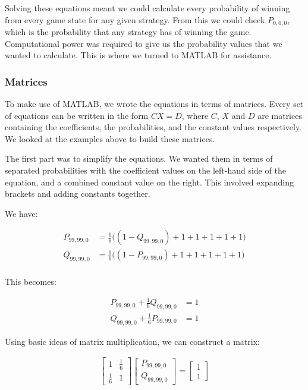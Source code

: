 \documentclass[a4paper,titlepage]{article}
\begin{document}
Solving these equations meant we could calculate every probability of winning from every game state for any given strategy. From this we could check $P_{0,0,0}$, which is the probability that any strategy has of winning the game. Computational power was required to give us the probability values that we wanted to calculate. This is where we turned to MATLAB for assistance.

\subsubsection{Matrices}
To make use of MATLAB, we wrote the equations in terms of matrices. Every set of equations can be written in the form $CX=D$, where $C$, $X$ and $D$ are matrices containing the coefficients, the probabilities, and the constant values respectively. We looked at the examples above to build these matrices.

The first part was to simplify the equations. We wanted them in terms of separated probabilities with the coefficient values on the left-hand side of the equation, and a combined constant value on the right. This involved expanding brackets and adding constants together.

 We have:

\begin{align*}
	P_{99,99,0} &= \frac{1}{6}\bigg((1 - Q_{99,99,0}) + 1 + 1 + 1 + 1 + 1\bigg)\\
	Q_{99,99,0} &= \frac{1}{6}\bigg((1 - P_{99,99,0}) + 1 + 1 + 1 + 1 + 1\bigg)\\
\end{align*}

This becomes:

\begin{align*}
	P_{99,99,0} + \frac{1}{6}Q_{99,99,0} &= 1\\
	Q_{99,99,0} + \frac{1}{6}P_{99,99,0} &= 1
\end{align*}

Using basic ideas of matrix multiplication, we can construct a matrix:

\begin{align*}
	\begin{bmatrix}
	    1          & \frac{1}{6}\\
	    \frac{1}{6} & 1
	\end{bmatrix}
	\begin{bmatrix}
		P_{99,99,0}\\
		Q_{99,99,0}
	\end{bmatrix}
	=
	\begin{bmatrix}
		1\\
		1
	\end{bmatrix}
\end{align*}
\end{document}
